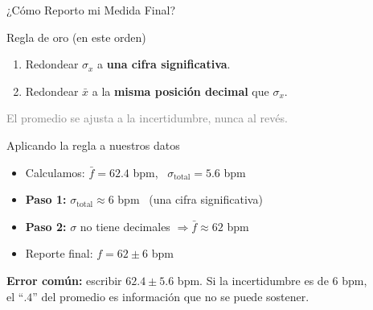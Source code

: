 \documentclass[aspectratio=169,xcolor=dvipsnames]{beamer}
\begin{document}
\begin{frame}{¿Cómo Reporto mi Medida Final?}
	\begin{block}{Regla de oro (en este orden)}
		\begin{enumerate}
			\item Redondear $\sigma_x$ a \textbf{una cifra significativa}.
			\item Redondear $\bar{x}$ a la \textbf{misma posición decimal} que $\sigma_x$.
		\end{enumerate}
		\centering
		\small \textcolor{gray}{El promedio se ajusta a la incertidumbre, nunca al revés.}
	\end{block}

	\begin{exampleblock}{Aplicando la regla a nuestros datos}
		\begin{itemize}
			\item Calculamos: $\bar f = 62.4$ bpm, \ $\sigma_{\text{total}} = 5.6$ bpm
			\item \textbf{Paso 1:} $\sigma_{\text{total}} \approx 6$ bpm \ (una cifra significativa)
			\item \textbf{Paso 2:} $\sigma$ no tiene decimales $\Rightarrow \bar f \approx 62$ bpm
			\item \alert{Reporte final: $f = 62 \pm 6$ bpm}
		\end{itemize}
	\end{exampleblock}

	\begin{center}
		\small \textbf{Error común:} escribir $\mathbf{62.4 \pm 5.6}$ bpm. Si la incertidumbre es de 6 bpm, \\ el ``$.4$'' del promedio es información que no se puede sostener.
	\end{center}
\end{frame}
\end{document}

